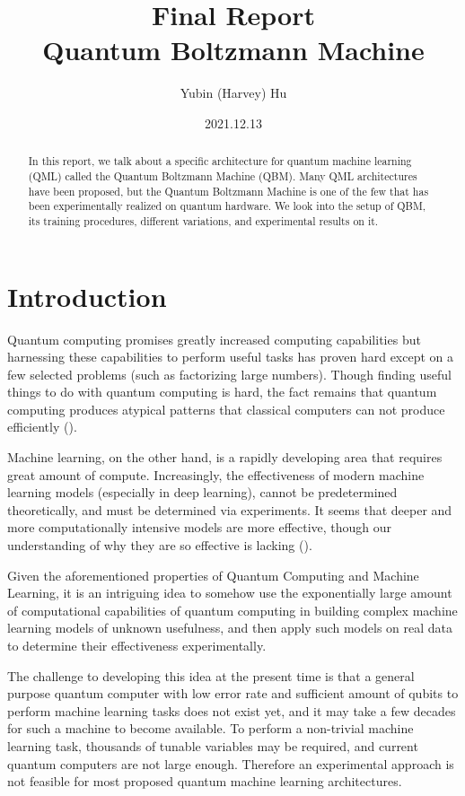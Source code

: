 \documentclass[letterpaper,11pt]{article}
\begin{document}
\title{Final Report \\\textbf{Quantum Boltzmann Machine}}
\author{Yubin (Harvey) Hu}
\date{2021.12.13}
\maketitle

\begin{abstract}
In this report, we talk about a specific architecture for quantum machine learning (QML) called the Quantum Boltzmann Machine (QBM). Many QML architectures have been proposed, but the Quantum Boltzmann Machine is one of the few that has been experimentally realized on quantum hardware. We look into the setup of QBM, its training procedures, different variations, and experimental results on it. 
\end{abstract}

\section{Introduction}
Quantum computing promises greatly increased computing capabilities but harnessing these capabilities to perform useful tasks has proven hard except on a few selected problems (such as factorizing large numbers). Though finding useful things to do with quantum computing is hard, the fact remains that quantum computing produces atypical patterns that classical computers can not produce efficiently (\cite{NatureQML}). \par

Machine learning, on the other hand, is a rapidly developing area that requires great amount of compute. Increasingly, the effectiveness of modern machine learning models (especially in deep learning), cannot be predetermined theoretically, and must be determined via experiments. It seems that deeper and more computationally intensive models are more effective, though our understanding of why they are so effective is lacking (\cite{DeepLearning}). \par

Given the aforementioned properties of Quantum Computing and Machine Learning, it is an intriguing idea to somehow use the exponentially large amount of computational capabilities of quantum computing in building complex machine learning models of unknown usefulness, and then apply such models on real data to determine their effectiveness experimentally. \par

The challenge to developing this idea at the present time is that a general purpose quantum computer with low error rate and sufficient amount of qubits to perform machine learning tasks does not exist yet, and it may take a few decades for such a machine to become available. To perform a non-trivial machine learning task, thousands of tunable variables may be required, and current quantum computers are not large enough. Therefore an experimental approach is not feasible for most proposed quantum machine learning architectures. 
\end{document}
